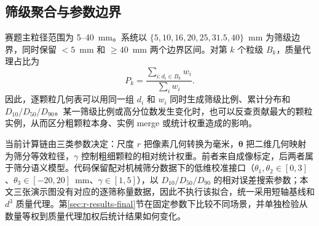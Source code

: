 \subsection{筛级聚合与参数边界}

赛题主粒径范围为 5--40~mm。系统以 $\{5,10,16,20,25,31.5,40\}$~mm 为筛级边界，同时保留 $<5$~mm 和 $\ge40$~mm 两个边界区间。对第 $k$ 个粒级 $B_k$，质量代理占比为
\begin{equation}
 P_k=\frac{\sum_{i:d_i\in B_k}w_i}{\sum_iw_i}.
\label{eq:r-final-bin}
\end{equation}
因此，逐颗粒几何表可以用同一组 $d_i$ 和 $w_i$ 同时生成筛级比例、累计分布和 $D_{10}/D_{50}/D_{90}$。某一筛级比例或高分位数发生变化时，也可以反查贡献最大的颗粒实例，从而区分粗颗粒本身、实例 merge 或统计权重造成的影响。

当前计算链由三类参数决定：尺度 $r$ 把像素几何转换为毫米，$\boldsymbol{\theta}$ 把二维几何映射为筛分等效粒径，$\gamma$ 控制粗细颗粒的相对统计权重。前者来自成像标定，后两者属于筛分语义模型。代码保留配对机械筛分数据下的低维校准接口（$\theta_1,\theta_2\in[0,3]$、$\theta_3\in[-20,20]$~mm、$\gamma\in[1,5]$），以 $D_{10}/D_{50}/D_{90}$ 的相对误差搜索参数；本文三张演示图没有对应的逐筛称量数据，因此不执行该拟合，统一采用短轴基线和 $d^3$ 质量代理。第\ref{sec:r-results-final}节在固定参数下比较不同场景，并单独检验从数量等权到质量代理加权后统计结果如何变化。